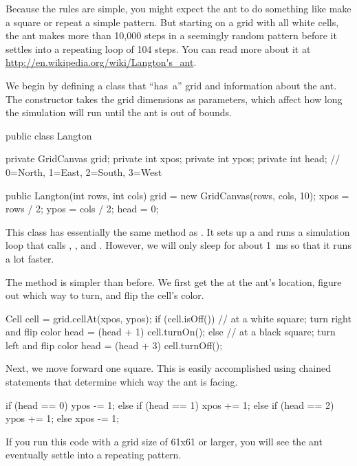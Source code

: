 Because the rules are simple, you might expect the ant to do something like make a square or repeat a simple pattern.
But starting on a grid with all white cells, the ant makes more than 10,000 steps in a seemingly random pattern before it settles into a repeating loop of 104 steps.
You can read more about it at \url{http://en.wikipedia.org/wiki/Langton's_ant}.

We begin by defining a  class that ``has~a'' grid and information about the ant.
The constructor takes the grid dimensions as parameters, which affect how long the simulation will run until the ant is out of bounds.

\begin{code}
public class Langton {
    private GridCanvas grid;
    private int xpos;
    private int ypos;
    private int head; // 0=North, 1=East, 2=South, 3=West

    public Langton(int rows, int cols) {
        grid = new GridCanvas(rows, cols, 10);
        xpos = rows / 2;
        ypos = cols / 2;
        head = 0;
    }
}
\end{code}

This class has essentially the same  method as .
It sets up a  and runs a simulation loop that calls , , and .
However, we will only sleep for about 1~ms so that it runs a lot faster.

The  method is simpler than before.
We first get the  at the ant's location, figure out which way to turn, and flip the cell's color.

\begin{code}
Cell cell = grid.cellAt(xpos, ypos);
if (cell.isOff()) {
    // at a white square; turn right and flip color
    head = (head + 1) %
    cell.turnOn();
} else {
    // at a black square; turn left and flip color
    head = (head + 3) %
    cell.turnOff();
}
\end{code}

Next, we move forward one square.
This is easily accomplished using chained  statements that determine which way the ant is facing.

\begin{code}
if (head == 0) {
    ypos -= 1;
} else if (head == 1) {
    xpos += 1;
} else if (head == 2) {
    ypos += 1;
} else {
    xpos -= 1;
}
\end{code}

If you run this code with a grid size of 61x61 or larger, you will see the ant eventually settle into a repeating pattern.


